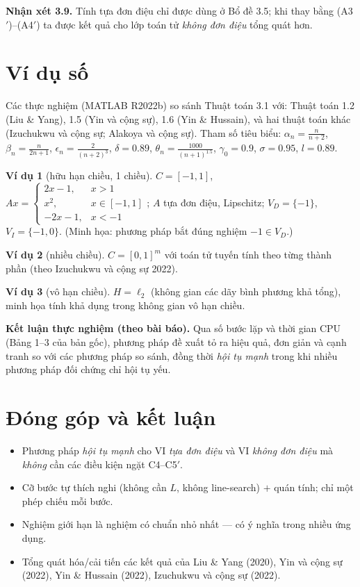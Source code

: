 \documentclass[11pt,a4paper]{article}
\theoremstyle{plain}
\theoremstyle{definition}
\newtheorem{example}{Ví dụ}
\begin{document}
\medskip
\noindent\textbf{Nhận xét 3.9.} Tính tựa đơn điệu chỉ được dùng ở Bổ đề 3.5; khi thay bằng (A3$'$)--(A4$'$) ta được kết quả cho lớp toán tử \emph{không đơn điệu} tổng quát hơn.

\section{Ví dụ số}

Các thực nghiệm (MATLAB R2022b) so sánh Thuật toán 3.1 với: Thuật toán 1.2 (Liu \& Yang), 1.5 (Yin và cộng sự), 1.6 (Yin \& Hussain), và hai thuật toán khác (Izuchukwu và cộng sự; Alakoya và cộng sự). Tham số tiêu biểu: $\alpha_n=\tfrac{n}{n+2}$, $\beta_n=\tfrac{n}{2n+1}$, $\epsilon_n=\tfrac{2}{(n+2)^3}$, $\delta=0.89$, $\theta_n=\tfrac{1000}{(n+1)^{1.5}}$, $\gamma_0=0.9$, $\sigma=0.95$, $l=0.89$.

\begin{example}[hữu hạn chiều, 1 chiều]
$C=[-1,1]$, $Ax=\begin{cases}2x-1,&x>1\\ x^2,&x\in[-1,1]\\ -2x-1,&x<-1\end{cases}$; $A$ tựa đơn điệu, Lipschitz; $V_D=\{-1\}$, $V_I=\{-1,0\}$. (Minh họa: phương pháp bắt đúng nghiệm $-1\in V_D$.)
\end{example}
\begin{example}[nhiều chiều]
$C=[0,1]^m$ với toán tử tuyến tính theo từng thành phần (theo Izuchukwu và cộng sự 2022).
\end{example}
\begin{example}[vô hạn chiều]
$H=\ell_2$ (không gian các dãy bình phương khả tổng), minh họa tính khả dụng trong không gian vô hạn chiều.
\end{example}

\noindent\textbf{Kết luận thực nghiệm (theo bài báo).} Qua số bước lặp và thời gian CPU (Bảng 1--3 của bản gốc), phương pháp đề xuất tỏ ra hiệu quả, đơn giản và cạnh tranh so với các phương pháp so sánh, đồng thời \emph{hội tụ mạnh} trong khi nhiều phương pháp đối chứng chỉ hội tụ yếu.

\section{Đóng góp và kết luận}

\begin{itemize}[leftmargin=1.4em,itemsep=1pt]
\item Phương pháp \emph{hội tụ mạnh} cho VI \emph{tựa đơn điệu} và VI \emph{không đơn điệu} mà \emph{không} cần các điều kiện ngặt C4--C5$'$.
\item Cỡ bước tự thích nghi (không cần $L$, không line-search) $+$ quán tính; chỉ một phép chiếu mỗi bước.
\item Nghiệm giới hạn là nghiệm có chuẩn nhỏ nhất --- có ý nghĩa trong nhiều ứng dụng.
\item Tổng quát hóa/cải tiến các kết quả của Liu \& Yang (2020), Yin và cộng sự (2022), Yin \& Hussain (2022), Izuchukwu và cộng sự (2022).
\end{itemize}
\end{document}
